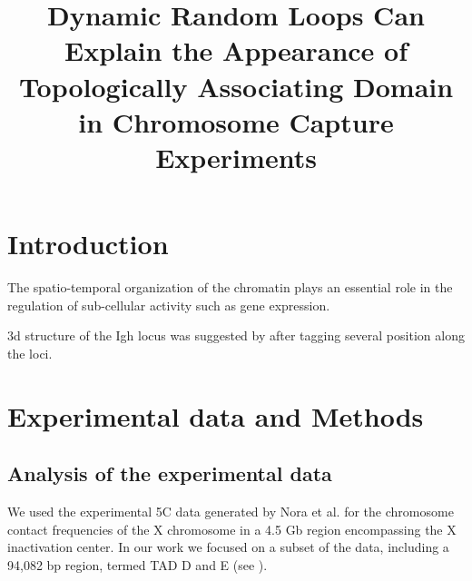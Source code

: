 \documentclass[12pt]{paper}
\begin{document}
\title{Dynamic Random Loops Can Explain the Appearance of Topologically Associating Domain in Chromosome Capture Experiments}
\maketitle

\section{Introduction}\label{section_introduction}

The spatio-temporal organization of the chromatin plays an essential role in the regulation of sub-cellular activity such as gene expression\cite{cremer2001chromosome}. 




3d structure of the Igh locus was suggested by \cite{jhunjhunwala20083d} after tagging several position along the loci. 


\section{Experimental data and Methods}\label{section_experimentalDataandMethods}
\subsection{Analysis of the experimental data}\label{subsection_analysisOfTheExperimentalData}
We used the experimental 5C data generated by Nora et al.\cite{Nora2012} for the chromosome contact frequencies of the X chromosome in a 4.5 Gb region encompassing the X inactivation center. In our work we focused on a subset of the data, including a 94,082 bp region, termed TAD D and E (see \cite{Nora2012}). 
\end{document}
